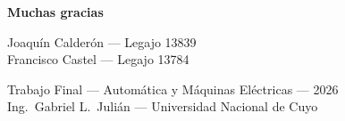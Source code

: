 \documentclass[aspectratio=169,t]{beamer}
\begin{document}
\begin{frame}[plain]
\vfill\centering
{\Huge\bfseries\color{uncBlue} Muchas gracias\par}
\vspace{8mm}
\vfill
{\small Joaquín Calderón --- Legajo 13839\\Francisco Castel --- Legajo 13784\par}
\vspace{4mm}
{\footnotesize\color{uncGray} Trabajo Final --- Automática y Máquinas Eléctricas --- 2026\\
Ing.\ Gabriel L.\ Julián --- Universidad Nacional de Cuyo}
\vfill
\end{frame}
\end{document}
